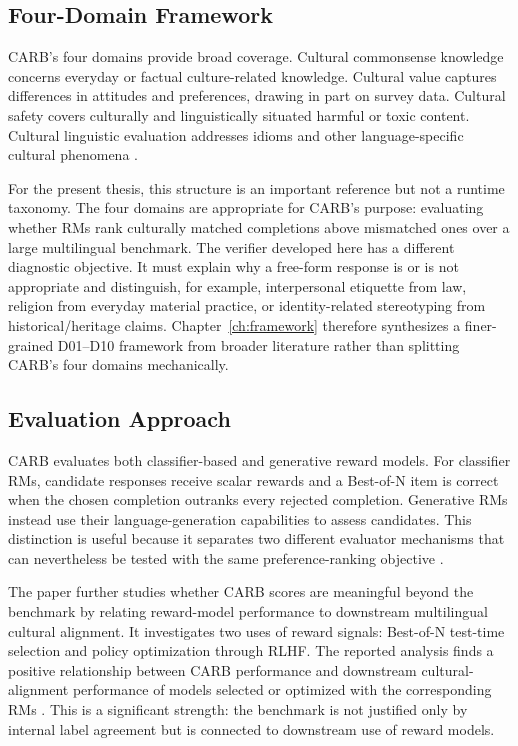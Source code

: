 \subsection{Four-Domain Framework}

CARB's four domains provide broad coverage. Cultural commonsense knowledge concerns everyday or factual culture-related knowledge. Cultural value captures differences in attitudes and preferences, drawing in part on survey data. Cultural safety covers culturally and linguistically situated harmful or toxic content. Cultural linguistic evaluation addresses idioms and other language-specific cultural phenomena \parencite{zhang2026carb}.

For the present thesis, this structure is an important reference but not a runtime taxonomy. The four domains are appropriate for CARB's purpose: evaluating whether RMs rank culturally matched completions above mismatched ones over a large multilingual benchmark. The verifier developed here has a different diagnostic objective. It must explain why a free-form response is or is not appropriate and distinguish, for example, interpersonal etiquette from law, religion from everyday material practice, or identity-related stereotyping from historical/heritage claims. Chapter~\ref{ch:framework} therefore synthesizes a finer-grained D01--D10 framework from broader literature rather than splitting CARB's four domains mechanically.

\subsection{Evaluation Approach}

CARB evaluates both classifier-based and generative reward models. For classifier RMs, candidate responses receive scalar rewards and a Best-of-N item is correct when the chosen completion outranks every rejected completion. Generative RMs instead use their language-generation capabilities to assess candidates. This distinction is useful because it separates two different evaluator mechanisms that can nevertheless be tested with the same preference-ranking objective \parencite{zhang2026carb}.

The paper further studies whether CARB scores are meaningful beyond the benchmark by relating reward-model performance to downstream multilingual cultural alignment. It investigates two uses of reward signals: Best-of-N test-time selection and policy optimization through RLHF. The reported analysis finds a positive relationship between CARB performance and downstream cultural-alignment performance of models selected or optimized with the corresponding RMs \parencite{zhang2026carb}. This is a significant strength: the benchmark is not justified only by internal label agreement but is connected to downstream use of reward models.

